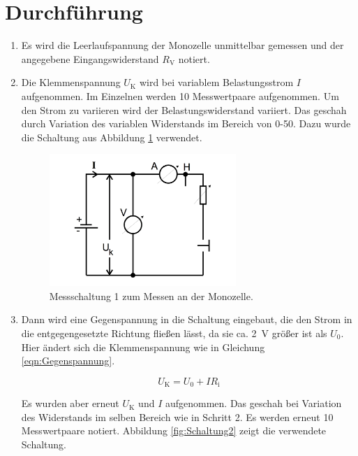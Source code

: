 \section{Durchführung}
\label{sec:Durchführung}

\begin{enumerate}
  \item  Es wird die Leerlaufspannung der Monozelle unmittelbar gemessen und
  der angegebene Eingangswiderstand $R_\text{V}$ notiert.

  \item  Die Klemmenspannung $U_\text{K}$ wird bei variablem Belastungsstrom $I$
  aufgenommen. Im Einzelnen werden 10 Messwertpaare aufgenommen.
  Um den Strom zu variieren wird  der Belastungswiderstand variiert.
  Das geschah durch Variation des variablen Widerstands im Bereich von 0-\SI{50}{\Omega}.
  Dazu wurde die Schaltung aus Abbildung \ref{fig:Schaltung1} verwendet.

\begin{figure}[h]
  \centering
  \includegraphics[height = 5cm]{Abbildung 1.pdf}
  \caption{Messschaltung 1 zum Messen an der Monozelle.\cite{anleitung}}
  \label{fig:Schaltung1}
\end{figure}

  \item Dann wird eine Gegenspannung in die Schaltung eingebaut, die den Strom
  in die entgegengesetzte Richtung fließen lässt, da sie ca. \SI{2}{\volt} größer
  ist als $U_{\text{0}}$. Hier ändert sich die Klemmenspannung
  wie in Gleichung \eqref{eqn:Gegenspannung}.

\begin{equation}
  U_\text{K} = U_\text{0} + IR_\text{i}
  \label{eqn:Gegenspannung}
\end{equation}

  Es wurden aber erneut $U_\text{K}$ und $I$ aufgenommen. Das geschah bei
  Variation des Widerstands im selben Bereich wie in Schritt 2. Es werden
  erneut 10 Messwertpaare notiert. Abbildung \ref{fig:Schaltung2}
  zeigt die verwendete Schaltung.


\end{enumerate}
